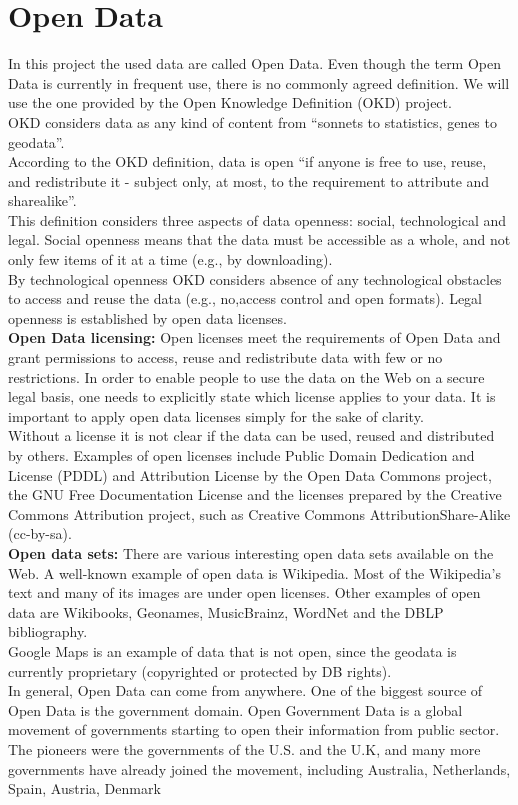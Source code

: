 \documentclass[a4paper,12pt,oneside]{report}
\begin{document}
{{{\section{Open Data}
{In this project the used data are called Open Data. Even though the term Open Data is currently in frequent use, there is no commonly agreed definition. We will use the one provided by the Open Knowledge Definition (OKD) project.\\
OKD considers data as any kind of content from “sonnets to statistics, genes to geodata”.\\
 According to the OKD definition, data is open “if anyone is free to use, reuse, and redistribute it - subject only, at most, to the requirement to attribute and sharealike”.\\
 This definition considers three aspects of data openness: social, technological and legal. Social openness means that the data must be accessible as a whole, and not only few items of it at a time (e.g., by downloading).\\
 By technological openness OKD considers absence of any technological obstacles to access and reuse the data (e.g., no,access control and open formats). Legal openness is established by open data licenses.\\
\textbf{Open Data licensing:} Open licenses meet the requirements of Open Data and grant permissions to access, reuse and redistribute data with few or no restrictions. In order to enable people to use the data on the Web on a secure legal basis, one needs to
explicitly state which license applies to your data. It is important to apply open data licenses simply for the sake of clarity. \\
Without a license it is not clear if the data can be used, reused and distributed by others. Examples of open licenses include Public Domain Dedication and License (PDDL) and Attribution License by the Open Data Commons project, the GNU Free Documentation License and the licenses prepared by the Creative Commons Attribution project, such as Creative Commons AttributionShare-Alike (cc-by-sa).\\
\textbf{Open data sets:} There are various interesting open data sets available on the Web. A well-known example of open data is Wikipedia. Most of the Wikipedia’s text and many of its images are under open licenses. Other examples of open data are Wikibooks, Geonames, MusicBrainz, WordNet and the DBLP bibliography. \\
Google Maps is an example of data that is not open, since the geodata is currently proprietary (copyrighted or protected by DB rights).\\
In general, Open Data can come from anywhere. One of the biggest source of Open Data is the government domain. Open Government Data is a global movement of governments starting to open their information from public sector. 
The pioneers were the governments of the U.S.  and the U.K, and many more governments have already joined the movement, including Australia, Netherlands, Spain, Austria, Denmark}
}}}
\end{document}
